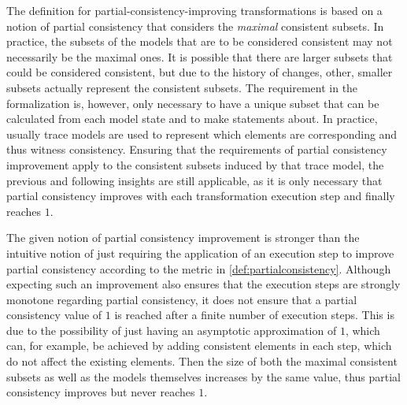 \begin{remark}
    The definition for partial-consistency-improving transformations is based on a notion of partial consistency that considers the \emph{maximal} consistent subsets.
    In practice, the subsets of the models that are to be considered consistent may not necessarily be the maximal ones.
    It is possible that there are larger subsets that could be considered consistent, but due to the history of changes, other, smaller subsets actually represent the consistent subsets.
    The requirement in the formalization is, however, only necessary to have a unique subset that can be calculated from each model state and to make statements about.
    In practice, usually trace models are used to represent which elements are corresponding and thus witness consistency.
    Ensuring that the requirements of partial consistency improvement apply to the consistent subsets induced by that trace model, the previous and following insights are still applicable, as it is only necessary that partial consistency improves with each transformation execution step and finally reaches $1$.
\end{remark}

The given notion of partial consistency improvement is stronger than the intuitive notion of just requiring the application of an execution step to improve partial consistency according to the metric in \autoref{def:partialconsistency}.
Although expecting such an improvement also ensures that the execution steps are strongly monotone regarding partial consistency, it does not ensure that a partial consistency value of $1$ is reached after a finite number of execution steps.
This is due to the possibility of just having an asymptotic approximation of $1$, which can, for example, be achieved by adding consistent elements in each step, which do not affect the existing elements.
Then the size of both the maximal consistent subsets as well as the models themselves increases by the same value, thus partial consistency improves but never reaches $1$.

